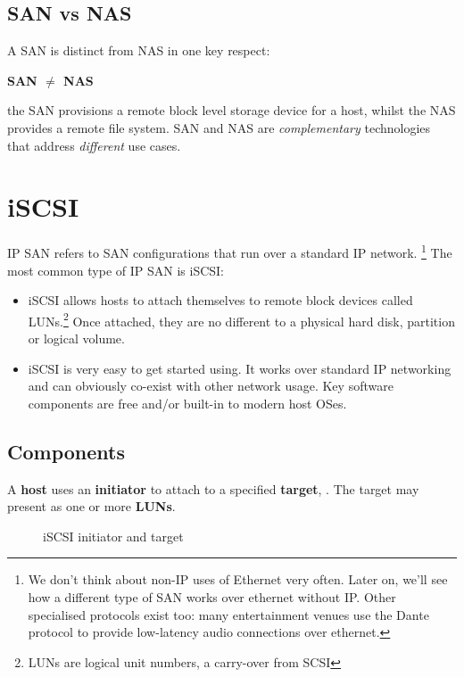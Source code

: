 \subsection{SAN vs NAS}\label{san-vs-nas}

A SAN is distinct from NAS in one key respect:

\textbf{SAN \(\ne\) NAS}

the SAN provisions a remote block level storage device for a host,
whilst the NAS provides a remote file system. SAN and NAS are
\emph{complementary} technologies that address \emph{different} use
cases.

\section{iSCSI}\label{iscsi}

IP SAN refers to SAN configurations that run over a standard IP network.
\footnote{We don't think about non-IP uses of Ethernet very often. Later
  on, we'll see how a different type of SAN works over ethernet without
  IP. Other specialised protocols exist too: many entertainment venues
  use the Dante protocol to provide low-latency audio connections over
  ethernet.} The most common type of IP SAN is iSCSI:

\begin{itemize}
\item
  iSCSI allows hosts to attach themselves to remote block devices called
  LUNs.\footnote{LUNs are logical unit numbers, a carry-over from SCSI}
  Once attached, they are no different to a physical hard disk,
  partition or logical volume.
\item
  iSCSI is very easy to get started using. It works over standard IP
  networking and can obviously co-exist with other network usage. Key
  software components are free and/or built-in to modern host OSes.
\end{itemize}

\subsection{Components}\label{components}

A \textbf{host} uses an \textbf{initiator} to attach to a specified
\textbf{target}, . The target may present as one or more \textbf{LUNs}.

\begin{figure}
\centering
\caption{iSCSI initiator and target{}}
\end{figure}

